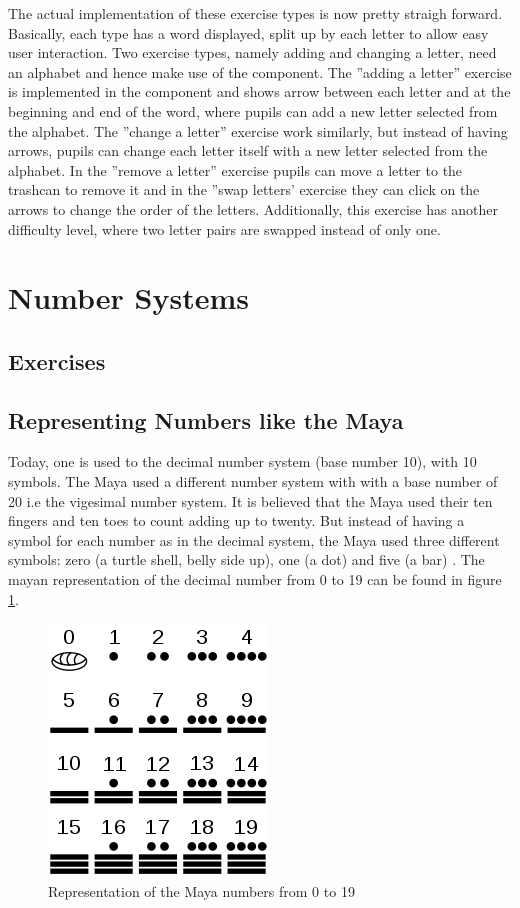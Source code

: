 The actual implementation of these exercise types is now pretty straigh forward. Basically, each type has a word displayed, split up by each letter to allow easy user interaction. Two exercise types, namely adding and changing a letter, need an alphabet and hence make use of the  component. The ''adding a letter'' exercise is implemented in the  component and shows arrow between each letter and at the beginning and end of the word, where pupils can add a new letter selected from the alphabet. The ''change a letter'' exercise work similarly, but instead of having arrows, pupils can change each letter itself with a new letter selected from the alphabet. In the ''remove a letter'' exercise pupils can move a letter to the trashcan to remove it and in the ''swap letters' exercise they can click on the arrows to change the order of the letters. Additionally, this exercise has another difficulty level, where two letter pairs are swapped instead of only one.

\section{Number Systems}
\label{section:numberSystems}

\subsection{Exercises}
\subsection*{Representing Numbers like the Maya}

Today, one is used to the decimal number system (base number 10), with 10 symbols. The Maya used a different number system with with a base number of 20 i.e the vigesimal number system. It is believed that the Maya used their ten fingers and ten toes to count adding up to twenty. But instead of having a symbol for each number as in the decimal system, the Maya used three different symbols: zero (a turtle shell, belly side up), one (a dot) and five (a bar) \cite{Maya}. The mayan representation of the decimal number from 0 to 19 can be found in figure \ref{fig:maya_numerals}.

\begin{figure} 
    \centering
    \includegraphics[width=0.3 \columnwidth]{figures/maya_number_system.png}
    \caption{Representation of the Maya numbers from 0 to 19} 
    \label{fig:maya_numerals} 
\end{figure}

